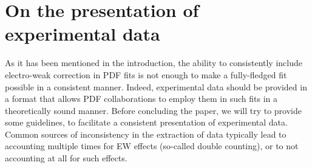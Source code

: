 \section{On the presentation of experimental data}
\label{sec:doublecounting}

As it has been mentioned in the introduction, the ability to consistently include electro-weak correction in
PDF fits is not enough to make a fully-fledged fit possible in a consistent manner. Indeed, experimental data should
be provided in  a format that allows PDF collaborations to employ them in such fits in a theoretically sound manner. Before concluding the paper,
we will try to provide some guidelines, to facilitate a consistent presentation of experimental data. Common sources of inconsistency in the extraction of data
typically lead to accounting multiple times for EW effects (so-called double counting), or to not accounting at
all for such effects.

